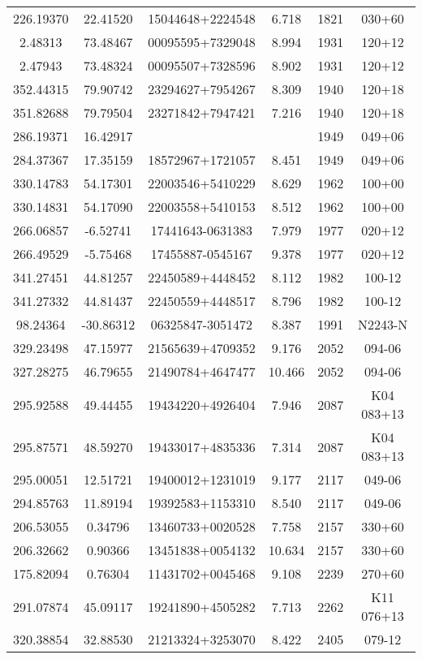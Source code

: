 \begin{longtable}{cccccc}
226.19370 & 22.41520 & 15044648+2224548 & 6.718 & 1821 & 030+60 \\
2.48313 & 73.48467 & 00095595+7329048 & 8.994 & 1931 & 120+12 \\
2.47943 & 73.48324 & 00095507+7328596 & 8.902 & 1931 & 120+12 \\
352.44315 & 79.90742 & 23294627+7954267 & 8.309 & 1940 & 120+18 \\
351.82688 & 79.79504 & 23271842+7947421 & 7.216 & 1940 & 120+18 \\
286.19371 & 16.42917 &  &  & 1949 & 049+06 \\
284.37367 & 17.35159 & 18572967+1721057 & 8.451 & 1949 & 049+06 \\
330.14783 & 54.17301 & 22003546+5410229 & 8.629 & 1962 & 100+00 \\
330.14831 & 54.17090 & 22003558+5410153 & 8.512 & 1962 & 100+00 \\
266.06857 & -6.52741 & 17441643-0631383 & 7.979 & 1977 & 020+12 \\
266.49529 & -5.75468 & 17455887-0545167 & 9.378 & 1977 & 020+12 \\
341.27451 & 44.81257 & 22450589+4448452 & 8.112 & 1982 & 100-12 \\
341.27332 & 44.81437 & 22450559+4448517 & 8.796 & 1982 & 100-12 \\
98.24364 & -30.86312 & 06325847-3051472 & 8.387 & 1991 & N2243-N \\
329.23498 & 47.15977 & 21565639+4709352 & 9.176 & 2052 & 094-06 \\
327.28275 & 46.79655 & 21490784+4647477 & 10.466 & 2052 & 094-06 \\
295.92588 & 49.44455 & 19434220+4926404 & 7.946 & 2087 & K04 083+13 \\
295.87571 & 48.59270 & 19433017+4835336 & 7.314 & 2087 & K04 083+13 \\
295.00051 & 12.51721 & 19400012+1231019 & 9.177 & 2117 & 049-06 \\
294.85763 & 11.89194 & 19392583+1153310 & 8.540 & 2117 & 049-06 \\
206.53055 & 0.34796 & 13460733+0020528 & 7.758 & 2157 & 330+60 \\
206.32662 & 0.90366 & 13451838+0054132 & 10.634 & 2157 & 330+60 \\
175.82094 & 0.76304 & 11431702+0045468 & 9.108 & 2239 & 270+60 \\
291.07874 & 45.09117 & 19241890+4505282 & 7.713 & 2262 & K11 076+13 \\
320.38854 & 32.88530 & 21213324+3253070 & 8.422 & 2405 & 079-12 \\

\end{longtable}
